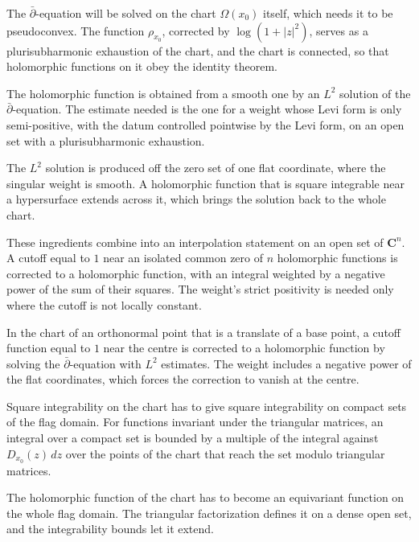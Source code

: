 The $\bar\partial$-equation will be solved on the chart $\Omega(x_0)$ itself, which needs it to be pseudoconvex. The
function $\rho_{x_0}$, corrected by $\log(1+|z|^2)$, serves as a plurisubharmonic exhaustion of the chart, and the
chart is connected, so that holomorphic functions on it obey the identity theorem.

The holomorphic function is obtained from a smooth one by an $L^2$ solution of the $\bar\partial$-equation. The
estimate needed is the one for a weight whose Levi form is only semi-positive, with the datum controlled pointwise
by the Levi form, on an open set with a plurisubharmonic exhaustion.

The $L^2$ solution is produced off the zero set of one flat coordinate, where the singular weight is smooth. A
holomorphic function that is square integrable near a hypersurface extends across it, which brings the solution
back to the whole chart.

These ingredients combine into an interpolation statement on an open set of $\mathbf C^n$. A cutoff equal to $1$
near an isolated common zero of $n$ holomorphic functions is corrected to a holomorphic function, with an integral
weighted by a negative power of the sum of their squares. The weight's strict positivity is needed only where the
cutoff is not locally constant.

In the chart of an orthonormal point that is a translate of a base point, a cutoff function equal to $1$ near the
centre is corrected to a holomorphic function by solving the $\bar\partial$-equation with $L^2$ estimates. The weight
includes a negative power of the flat coordinates, which forces the correction to vanish at the centre.

Square integrability on the chart has to give square integrability on compact sets of the flag domain. For
functions invariant under the triangular matrices, an integral over a compact set is bounded by a multiple of the
integral against $D_{x_0}(z)\,dz$ over the points of the chart that reach the set modulo triangular matrices.

The holomorphic function of the chart has to become an equivariant function on the whole flag domain. The
triangular factorization defines it on a dense open set, and the integrability bounds let it extend.

